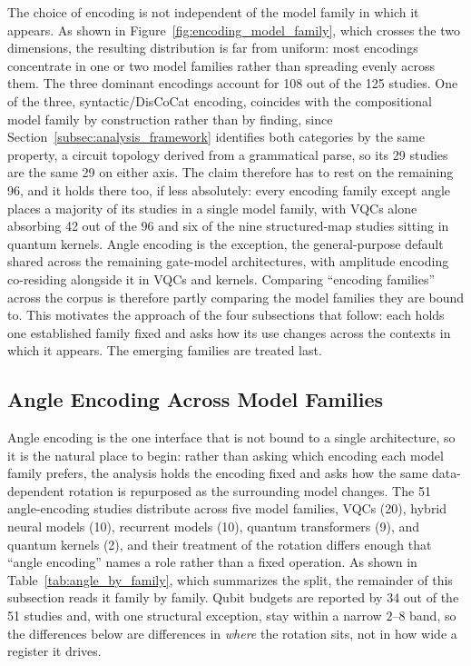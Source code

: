 \documentclass{ieeeaccess}
\begin{document}
The choice of encoding is not independent of the model family in which it appears. As shown in Figure~\ref{fig:encoding_model_family}, which crosses the two dimensions, the resulting distribution is far from uniform: most encodings concentrate in one or two model families rather than spreading evenly across them. The three dominant encodings account for 108 out of the 125 studies. One of the three, syntactic/DisCoCat encoding, coincides with the compositional model family by construction rather than by finding, since Section~\ref{subsec:analysis_framework} identifies both categories by the same property, a circuit topology derived from a grammatical parse, so its 29 studies are the same 29 on either axis. The claim therefore has to rest on the remaining 96, and it holds there too, if less absolutely: every encoding family except angle places a majority of its studies in a single model family, with VQCs alone absorbing 42 out of the 96 and six of the nine structured-map studies sitting in quantum kernels. Angle encoding is the exception, the general-purpose default shared across the remaining gate-model architectures, with amplitude encoding co-residing alongside it in VQCs and kernels. Comparing ``encoding families'' across the corpus is therefore partly comparing the model families they are bound to. This motivates the approach of the four subsections that follow: each holds one established family fixed and asks how its use changes across the contexts in which it appears. The emerging families are treated last.

\subsection{Angle Encoding Across Model Families}
\label{subsec:angle_across_families}

Angle encoding is the one interface that is not bound to a single architecture, so it is the natural place to begin: rather than asking which encoding each model family prefers, the analysis holds the encoding fixed and asks how the same data-dependent rotation is repurposed as the surrounding model changes. The 51 angle-encoding studies distribute across five model families, VQCs (20), hybrid neural models (10), recurrent models (10), quantum transformers (9), and quantum kernels (2), and their treatment of the rotation differs enough that ``angle encoding'' names a role rather than a fixed operation. As shown in Table~\ref{tab:angle_by_family}, which summarizes the split, the remainder of this subsection reads it family by family. Qubit budgets are reported by 34 out of the 51 studies and, with one structural exception, stay within a narrow $2$--$8$ band, so the differences below are differences in \emph{where} the rotation sits, not in how wide a register it drives.
\end{document}

